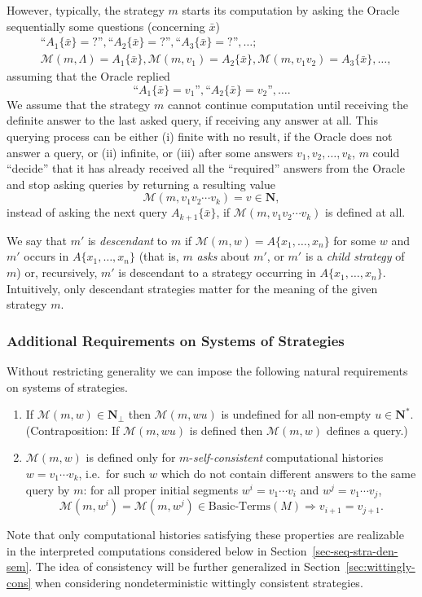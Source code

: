 \documentclass[fleqn]{LMCS}
\theoremstyle{plain}\newtheorem{satz}[thm]{Satz}
\theoremstyle{plain}\newtheorem{hyp}[thm]{Hypothesis}
\theoremstyle{plain}\newtheorem{hyps}[thm]{Hypotheses}
\theoremstyle{definition}\newtheorem{note}[thm]{Note}
\newcommand{\lqq}{\mbox{``}}
\newcommand{\rqq}{\mbox{''}}
\newcommand{\setof}[1]{\{#1\}}
\newcommand{\Arrr}{\Longrightarrow}
\newcommand{\NN}{\mathbf{N}}
\newcommand{\Undef}{{\perp}}
\newcommand{\MM}{{\mathcal M}}
\newcommand{\bx}{\bar{x}}
\newcommand{\?}{\mbox{?}}
\begin{document}
However, typically, the strategy $m$ starts its computation 
by asking the Oracle sequentially some questions  
(concerning $\bx$) 
\begin{align*}
&\lqq A_1\{\bx\}=\?\rqq, 
\lqq A_2\{\bx\}=\?\rqq, 
\lqq A_3\{\bx\}=\?\rqq, 
\ldots; 
\\
&\MM(m,\Lambda)=A_1\{\bx\}, 
\MM(m,v_1)=A_2\{\bx\}, 
\MM(m,v_{1}v_{2})=A_3\{\bx\}, 
\ldots, 
\end{align*}
assuming that the Oracle replied 
\[
\lqq A_1\{\bx\}=v_1 \rqq, \lqq A_2\{\bx\}=v_2 \rqq, \ldots. 
\]
We assume that the strategy $m$ cannot continue computation until 
receiving the definite answer to the last asked query, if receiving 
any answer at all. 
This querying process can be either 
(i) finite with no result, if the Oracle does not answer a query, or 
(ii) infinite, or (iii) after some answers $v_{1},v_{2},\ldots, v_{k}$,  
$m$ could ``decide'' that it has already received 
all the ``required'' answers from the Oracle and stop asking queries  
by returning a resulting value 
\[
\MM(m,v_{1}v_{2}\cdots v_{k})=v\in\NN,
\]
instead of asking the next query $A_{k+1}\setof{\bx}$, 
if 
$\MM(m,v_{1}v_{2}\cdots v_{k})$ is defined at all. 

 
We say that $m'$ is \emph{descendant} to $m$ if 
$\MM(m,w) = A\{x_1,\ldots, x_n\}$ for some $w$ 
and $m'$ occurs in $A\{x_1,\ldots, x_n\}$ 
(that is, $m$ \emph{asks} about $m'$, or $m'$ is a \emph{child strategy} of $m$)
or, recursively, $m'$ is descendant to a strategy occurring in 
$A\{x_1,\ldots, x_n\}$. Intuitively, only descendant strategies 
matter for the meaning of the given strategy $m$. 


\subsubsection{Additional Requirements on Systems of Strategies}
\label{sec:additional-requirements}

Without restricting generality we can impose the following 
natural requirements on systems of strategies. 
\begin{enumerate}[$\bullet$]
\item
If 
$\MM(m,w)\in\NN_\Undef$ then $\MM(m,wu)$ is undefined  
for all non-empty $u\in\NN^*$. 
(Contraposition: If $\MM(m,wu)$ is defined then $\MM(m,w)$ defines a query.)
\item 
$\MM(m,w)$ is defined only for $m$-\emph{self-consistent}  
computational histories 
$w=v_1\cdots v_k$, i.e.\ for such $w$ which 
do not contain different answers 
to the same query by $m$: 
for all proper initial segments $w^i=v_1\cdots v_i$  
and $w^j=v_1\cdots v_j$, 
\[
\MM(m,w^i)=\MM(m,w^j)\in\mbox{Basic-Terms}(M)\Arrr v_{i+1}=v_{j+1}. 
\] 
\end{enumerate}
Note that only computational histories 
satisfying these properties are realizable in 
the interpreted computations considered below in 
Section~\ref{sec-seq-stra-den-sem}. The idea of consistency 
will be further generalized in 
Section~\ref{sec:wittingly-cons} 
when considering nondeterministic wittingly consistent strategies. 
\end{document}
